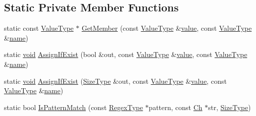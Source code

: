 \subsection*{Static Private Member Functions}
\begin{DoxyCompactItemize}
\item 
static const \hyperlink{classinternal_1_1Schema_a8976b6d7e2a885483d0b51d941019340}{Value\+Type} $\ast$ \hyperlink{classinternal_1_1Schema_aedf4000944036d010bf6eedcbcf7c8ae}{Get\+Member} (const \hyperlink{classinternal_1_1Schema_a8976b6d7e2a885483d0b51d941019340}{Value\+Type} \&\hyperlink{imgui__impl__opengl3__loader_8h_a32aff7c6c4cd253fdf6563677afab5ce}{value}, const \hyperlink{classinternal_1_1Schema_a8976b6d7e2a885483d0b51d941019340}{Value\+Type} \&\hyperlink{imgui__impl__opengl3__loader_8h_a5c4947d4516dd7cfa3505ce3a648a4ef}{name})
\item 
static \hyperlink{imgui__impl__opengl3__loader_8h_ac668e7cffd9e2e9cfee428b9b2f34fa7}{void} \hyperlink{classinternal_1_1Schema_a46ccbd17094962256ae9ea12c31f4f92}{Assign\+If\+Exist} (bool \&out, const \hyperlink{classinternal_1_1Schema_a8976b6d7e2a885483d0b51d941019340}{Value\+Type} \&\hyperlink{imgui__impl__opengl3__loader_8h_a32aff7c6c4cd253fdf6563677afab5ce}{value}, const \hyperlink{classinternal_1_1Schema_a8976b6d7e2a885483d0b51d941019340}{Value\+Type} \&\hyperlink{imgui__impl__opengl3__loader_8h_a5c4947d4516dd7cfa3505ce3a648a4ef}{name})
\item 
static \hyperlink{imgui__impl__opengl3__loader_8h_ac668e7cffd9e2e9cfee428b9b2f34fa7}{void} \hyperlink{classinternal_1_1Schema_a2dd176fa402942fd45301efcc6bb0e3f}{Assign\+If\+Exist} (\hyperlink{rapidjson_8h_a5ed6e6e67250fadbd041127e6386dcb5}{Size\+Type} \&out, const \hyperlink{classinternal_1_1Schema_a8976b6d7e2a885483d0b51d941019340}{Value\+Type} \&\hyperlink{imgui__impl__opengl3__loader_8h_a32aff7c6c4cd253fdf6563677afab5ce}{value}, const \hyperlink{classinternal_1_1Schema_a8976b6d7e2a885483d0b51d941019340}{Value\+Type} \&\hyperlink{imgui__impl__opengl3__loader_8h_a5c4947d4516dd7cfa3505ce3a648a4ef}{name})
\item 
static bool \hyperlink{classinternal_1_1Schema_a60f7d6fe83273d9d46d4f59a59fc0593}{Is\+Pattern\+Match} (const \hyperlink{classinternal_1_1Schema_a78fd42fda3cecdad0ee56559b4e3cec6}{Regex\+Type} $\ast$pattern, const \hyperlink{classinternal_1_1Schema_a98043fca39adbf8b42e7472e3d80d6fa}{Ch} $\ast$str, \hyperlink{rapidjson_8h_a5ed6e6e67250fadbd041127e6386dcb5}{Size\+Type})
\end{DoxyCompactItemize}
